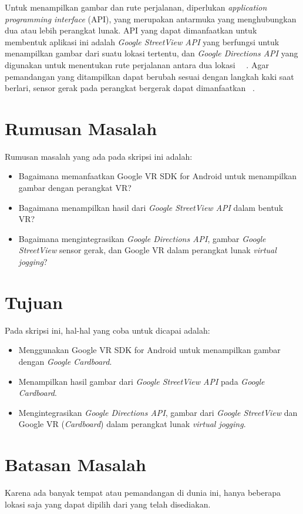 Untuk menampilkan gambar dan rute perjalanan, diperlukan \textit{application programming interface} (API), yang merupakan antarmuka yang menghubungkan dua atau lebih perangkat lunak. API yang dapat dimanfaatkan untuk membentuk aplikasi  ini adalah \textit{Google StreetView API} yang berfungsi untuk menampilkan  gambar dari suatu lokasi tertentu, dan \textit{Google Directions API} yang digunakan untuk menentukan rute perjalanan antara dua lokasi ~\cite{streetview-api}~\cite{directions-api}. Agar pemandangan yang ditampilkan dapat berubah sesuai dengan langkah kaki saat berlari, sensor gerak pada perangkat bergerak dapat dimanfaatkan ~\cite{motion-sensor}. 
  
\section{Rumusan Masalah}
\label{sec:rumusan}
Rumusan masalah yang ada pada skripsi ini adalah:
\begin{itemize}
	\item Bagaimana memanfaatkan Google VR SDK for Android untuk menampilkan gambar dengan perangkat VR?
	\item Bagaimana menampilkan hasil dari \textit{Google StreetView API} dalam bentuk VR?
	\item Bagaimana mengintegrasikan \textit{Google Directions API}, gambar \textit{Google StreetView}  sensor gerak, dan Google VR dalam perangkat lunak \textit{virtual jogging}?
\end{itemize}

\section{Tujuan}
\label{sec:tujuan}
Pada skripsi ini, hal-hal yang coba untuk dicapai adalah:
\begin{itemize}
	\item Menggunakan Google VR SDK for Android untuk menampilkan gambar dengan {\it Google Cardboard}.
	\item Menampilkan hasil gambar dari \textit{Google StreetView API} pada {\it Google Cardboard}.
	\item Mengintegrasikan \textit{Google Directions API}, gambar dari \textit{Google StreetView} dan Google VR (\textit{Cardboard}) dalam perangkat lunak {\it virtual jogging}.
\end{itemize}

\section{Batasan Masalah}
\label{sec:batasan}
Karena ada banyak tempat atau pemandangan di dunia ini, hanya beberapa lokasi saja yang dapat dipilih dari yang telah disediakan.

